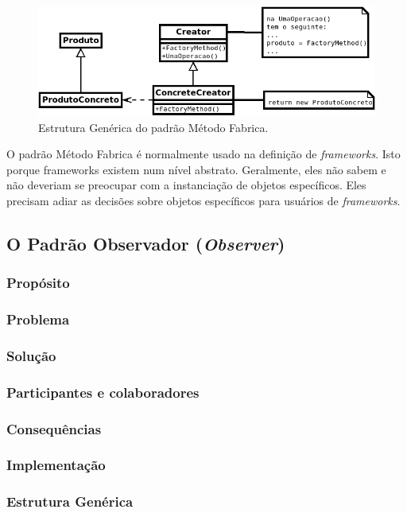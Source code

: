 \begin{figure}[h]
\begin{center}
\includegraphics[scale=0.6]{factoryMethod.png}
\caption{Estrutura Genérica do padrão Método Fabrica.}\label{fig:factMeth}
\end{center}
\end{figure}

O padrão Método Fabrica é normalmente usado na definição de \textit{frameworks}. Isto porque frameworks existem num nível abstrato. Geralmente, eles não sabem e não deveriam se preocupar  com a instanciação de objetos específicos. Eles precisam adiar as decisões sobre objetos específicos para usuários de \textit{frameworks}.

\subsection{O Padrão Observador (\textit{Observer})}
\subsubsection{Propósito}
\subsubsection{Problema}
\subsubsection{Solução}
\subsubsection{Participantes e colaboradores}
\subsubsection{Consequências}
\subsubsection{Implementação}
\subsubsection{Estrutura Genérica}


